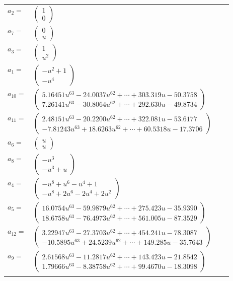 \documentclass[1p]{elsarticle_modified}
\theoremstyle{definition}
\begin{document}
\begin{tabular}{m{7pt} m{180pt} m{7pt} m{180pt} }
\flushright $a_{2}=$&$\begin{pmatrix}1\\0\end{pmatrix}$ \\
\flushright $a_{7}=$&$\begin{pmatrix}0\\u\end{pmatrix}$ \\
\flushright $a_{3}=$&$\begin{pmatrix}1\\u^2\end{pmatrix}$ \\
\flushright $a_{1}=$&$\begin{pmatrix}- u^2+1\\- u^4\end{pmatrix}$ \\
\flushright $a_{10}=$&$\begin{pmatrix}5.16451 u^{63}-24.0037 u^{62}+\cdots+303.319 u-50.3758\\7.26141 u^{63}-30.8064 u^{62}+\cdots+292.630 u-49.8734\end{pmatrix}$ \\
\flushright $a_{11}=$&$\begin{pmatrix}2.48151 u^{63}-20.2200 u^{62}+\cdots+322.081 u-53.6177\\-7.81243 u^{63}+18.6263 u^{62}+\cdots+60.5318 u-17.3706\end{pmatrix}$ \\
\flushright $a_{6}=$&$\begin{pmatrix}u\\u\end{pmatrix}$ \\
\flushright $a_{8}=$&$\begin{pmatrix}- u^3\\- u^3+u\end{pmatrix}$ \\
\flushright $a_{4}=$&$\begin{pmatrix}- u^8+u^6- u^4+1\\- u^8+2 u^6-2 u^4+2 u^2\end{pmatrix}$ \\
\flushright $a_{5}=$&$\begin{pmatrix}16.0754 u^{63}-59.9879 u^{62}+\cdots+275.423 u-35.9390\\18.6758 u^{63}-76.4973 u^{62}+\cdots+561.005 u-87.3529\end{pmatrix}$ \\
\flushright $a_{12}=$&$\begin{pmatrix}3.22947 u^{63}-27.3703 u^{62}+\cdots+454.241 u-78.3087\\-10.5895 u^{63}+24.5239 u^{62}+\cdots+149.285 u-35.7643\end{pmatrix}$ \\
\flushright $a_{9}=$&$\begin{pmatrix}2.61568 u^{63}-11.2817 u^{62}+\cdots+143.423 u-21.8542\\1.79666 u^{63}-8.38758 u^{62}+\cdots+99.4670 u-18.3098\end{pmatrix}$\\&\end{tabular}
\end{document}
